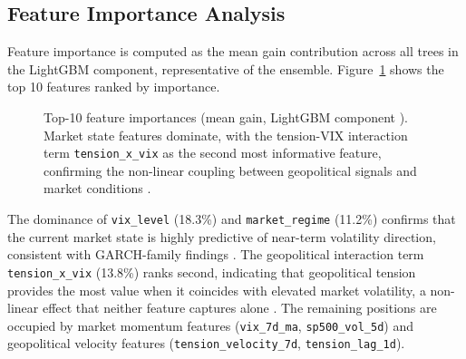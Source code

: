 \documentclass[12pt,a4paper]{report}
\begin{document}
\subsection{Feature Importance Analysis}

Feature importance is computed as the mean gain contribution across all
trees in the LightGBM component, representative of the ensemble.
Figure~\ref{fig:feat_imp} shows the top 10 features ranked by importance.

\begin{figure}[H]
\centering
{}
\caption{Top-10 feature importances (mean gain, LightGBM component
  \cite{ke2017}). Market state features dominate, with the tension-VIX
  interaction term \texttt{tension\_x\_vix} as the second most
  informative feature, confirming the non-linear coupling between
  geopolitical signals and market conditions \cite{bloom2009}.}
\label{fig:feat_imp}
\end{figure}

The dominance of \texttt{vix\_level} (18.3\%) and \texttt{market\_regime}
(11.2\%) confirms that the current market state is highly predictive of
near-term volatility direction, consistent with GARCH-family findings
\cite{bollerslev1986, engle1982}. The geopolitical interaction term
\texttt{tension\_x\_vix} (13.8\%) ranks second, indicating that
geopolitical tension provides the most value when it coincides with
elevated market volatility, a non-linear effect that neither feature
captures alone \cite{bloom2009, caldara2022}. The remaining positions
are occupied by market momentum features (\texttt{vix\_7d\_ma},
\texttt{sp500\_vol\_5d}) and geopolitical velocity features
(\texttt{tension\_velocity\_7d}, \texttt{tension\_lag\_1d}).
\newpage
\end{document}
